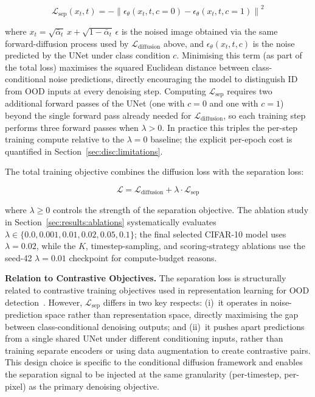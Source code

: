 \begin{equation}
\label{eq:meth:lsep}
\mathcal{L}_{\text{sep}}(x_t, t) = -\left\| \epsilon_\theta(x_t, t, c{=}0) - \epsilon_\theta(x_t, t, c{=}1) \right\|^2
\end{equation}

where $x_t = \sqrt{\bar{\alpha}_t}\, x + \sqrt{1 - \bar{\alpha}_t}\, \epsilon$ is the noised image obtained via the same forward-diffusion process used by $\mathcal{L}_{\text{diffusion}}$ above, and $\epsilon_\theta(x_t, t, c)$ is the noise predicted by the UNet under class condition $c$. Minimising this term (as part of the total loss) maximises the squared Euclidean distance between class-conditional noise predictions, directly encouraging the model to distinguish ID from OOD inputs at every denoising step. Computing $\mathcal{L}_{\text{sep}}$ requires two additional forward passes of the UNet (one with $c{=}0$ and one with $c{=}1$) beyond the single forward pass already needed for $\mathcal{L}_{\text{diffusion}}$, so each training step performs three forward passes when $\lambda > 0$. In practice this triples the per-step training compute relative to the $\lambda{=}0$ baseline; the explicit per-epoch cost is quantified in Section~\ref{sec:disc:limitations}.

The total training objective combines the diffusion loss with the separation loss:

\begin{equation}
\label{eq:meth:ltotal}
\mathcal{L} = \mathcal{L}_{\text{diffusion}} + \lambda \cdot \mathcal{L}_{\text{sep}}
\end{equation}

where $\lambda \geq 0$ controls the strength of the separation objective. The ablation study in Section~\ref{sec:results:ablations} systematically evaluates $\lambda \in \{0.0, 0.001, 0.01, 0.02, 0.05, 0.1\}$; the final selected CIFAR-10 model uses $\lambda = 0.02$, while the $K$, timestep-sampling, and scoring-strategy ablations use the seed-42 $\lambda=0.01$ checkpoint for compute-budget reasons.

\textbf{Relation to Contrastive Objectives.} The separation loss is structurally related to contrastive training objectives used in representation learning for OOD detection~\cite{tack2020csi, wu2024diffusion}. However, $\mathcal{L}_{\text{sep}}$ differs in two key respects: (i)~it operates in noise-prediction space rather than representation space, directly maximising the gap between class-conditional denoising outputs; and (ii)~it pushes apart predictions from a single shared UNet under different conditioning inputs, rather than training separate encoders or using data augmentation to create contrastive pairs. This design choice is specific to the conditional diffusion framework and enables the separation signal to be injected at the same granularity (per-timestep, per-pixel) as the primary denoising objective.

